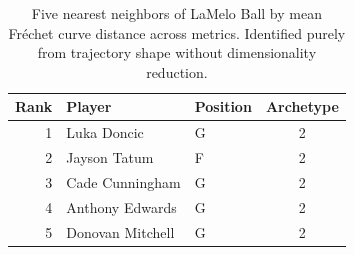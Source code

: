 \begin{table}[htbp]
  \centering\small
  \begin{tabular}{rllc}
    \toprule
    Rank & Player & Position & Archetype \\
    \midrule
    1 & Luka Doncic & G & 2 \\
    2 & Jayson Tatum & F & 2 \\
    3 & Cade Cunningham & G & 2 \\
    4 & Anthony Edwards & G & 2 \\
    5 & Donovan Mitchell & G & 2 \\
    \bottomrule
  \end{tabular}
  \caption{Five nearest neighbors of LaMelo Ball by mean Fr\'{e}chet curve distance across metrics. Identified purely from trajectory shape without dimensionality reduction.}
  \label{tab:LaMelo_Ball_frechet_curve_neighbors}
\end{table}

